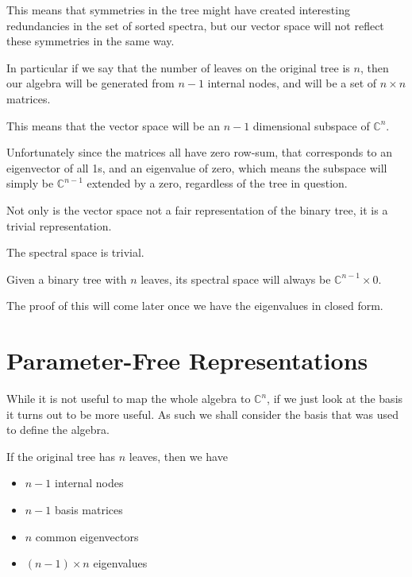 \documentclass[10pt,a4paper]{report}
\begin{document}
This means that symmetries in the tree might have created interesting
redundancies in the set of sorted spectra, but our vector space will not
reflect these symmetries in the same way.

In particular if we say that the number of leaves on the original tree is $n$,
then our algebra will be generated from $n-1$ internal nodes, and will be a set
of $n \times n$ matrices.

This means that the vector space will be an $n-1$ dimensional subspace of
$\mathds{C}^n$.

Unfortunately since the matrices all have zero row-sum, that corresponds to an
eigenvector of all 1s, and an eigenvalue of zero, which means the subspace will
simply be $\mathds{C}^{n-1}$ extended by a zero, regardless of the tree in
question.

Not only is the vector space not a fair representation of the binary tree, it
is a trivial representation.

\begin{theorem-wip} The spectral space is trivial.

	Given a binary tree with $n$ leaves, its spectral space will always be
	$\mathds{C}^{n-1} \times {0}$.
\end{theorem-wip}

The proof of this will come later once we have the eigenvalues in closed form.

\section{Parameter-Free Representations}

While it is not useful to map the whole algebra to $\mathds{C}^n$, if we just
look at the basis it turns out to be more useful.
As such we shall consider the basis that was used to define the algebra.

If the original tree has $n$ leaves, then we have
\begin{itemize}
	\item $n-1$ internal nodes
	\item $n-1$ basis matrices
	\item $n$ common eigenvectors
	\item $(n-1) \times n$ eigenvalues
\end{itemize}
\end{document}
